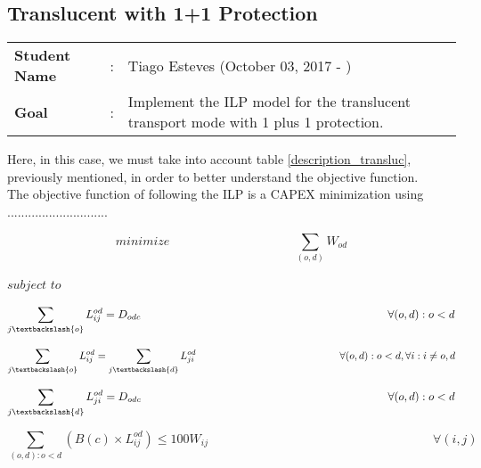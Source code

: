 \clearpage

\subsection{Translucent with 1+1 Protection}\label{ILP_Transluc_Protection}
\begin{tcolorbox}	
\begin{tabular}{p{2.75cm} p{0.2cm} p{10.5cm}} 	
\textbf{Student Name}  &:& Tiago Esteves    (October 03, 2017 - )\\
\textbf{Goal}          &:& Implement the ILP model for the translucent transport mode with 1 plus 1 protection.
\end{tabular}
\end{tcolorbox}
\vspace{11pt}

Here, in this case, we must take into account table \ref{description_transluc}, previously mentioned, in order to better understand the objective function.\\

The objective function of following the ILP is a CAPEX minimization using .............................


\begin{equation}
minimize \qquad \qquad \qquad \qquad \qquad  \sum_{(o,d)} W_{od}
\label{ILPTransluc}
\end{equation}

$subject$ $to$

\begin{equation}
\sum_{j \textbackslash \{o\} } L_{ij}^{od} = D_{odc}
\qquad \qquad \qquad \qquad \qquad \qquad \qquad \qquad \qquad \qquad \qquad
\forall (o,d):o<d
\label{ILPTransluc1}
\end{equation}

\begin{equation}
\sum_{j \textbackslash \{o\} } L_{ij}^{od} = \sum_{j \textbackslash \{d\} } L_{ji}^{od}
\qquad \qquad \qquad \qquad \qquad \qquad \qquad
\forall (o,d):o<d , \forall i : i \neq o,d
\label{ILPTransluc2}
\end{equation}

\begin{equation}
\sum_{j \textbackslash \{d\} } L_{ji}^{od} = D_{odc}
\qquad \qquad \qquad \qquad \qquad \qquad \qquad \qquad \qquad \qquad \qquad
\forall (o,d):o<d
\label{ILPTransluc3}
\end{equation}

\begin{equation}
\sum_{(o,d):o<d} \left( B(c) \times L_{ij}^{od}\right) \leq  100 W_{ij}
\qquad \qquad \qquad \qquad \qquad \qquad \qquad \qquad \qquad
\forall (i,j)
\label{ILPTransluc4}
\end{equation}

